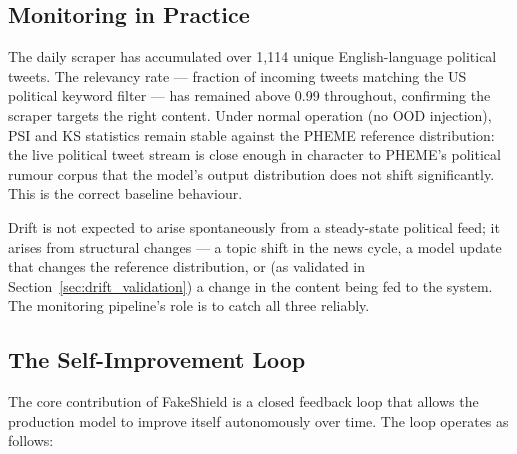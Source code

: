 \documentclass[sigconf]{acmart}
\begin{document}
\subsection{Monitoring in Practice}

The daily scraper has accumulated over 1,114 unique English-language political tweets. The
relevancy rate — fraction of incoming tweets matching the US political keyword filter — has
remained above 0.99 throughout, confirming the scraper targets the right content. Under
normal operation (no OOD injection), PSI and KS statistics remain stable against the
PHEME reference distribution: the live political tweet stream is close enough in character
to PHEME's political rumour corpus that the model's output distribution does not shift
significantly. This is the correct baseline behaviour.

Drift is not expected to arise spontaneously from a steady-state political feed; it arises
from structural changes — a topic shift in the news cycle, a model update that changes the
reference distribution, or (as validated in Section~\ref{sec:drift_validation}) a change
in the content being fed to the system. The monitoring pipeline's role is to catch all three
reliably.

\subsection{The Self-Improvement Loop}

The core contribution of FakeShield is a closed feedback loop that allows the production
model to improve itself autonomously over time. The loop operates as follows:
\end{document}
